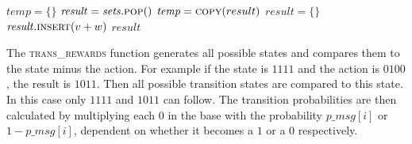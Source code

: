 \documentclass{article}
\begin{document}
		\begin{algorithm}[h!]
			\begin{algorithmic}[1]
				\State $\mathit{temp} = \{\}$
				\State $\mathit{result} = \mathit{sets}.\Call{pop}{}()$
				\State $\mathit{temp} = \Call{copy}{result}$
				\State $\mathit{result} = \{\}$
				\State $\mathit{result}.\Call{insert}{v+w}$
				\EndFor
				\EndFor
				\EndFor
				\State \Return $\mathit{result}$
				\EndFunction
			\end{algorithmic}
			\label{alg:add_sets}
		\end{algorithm}

		\begin{multicols}{2}
		The \textsc{trans\_rewards} function generates all possible states and
		compares them to the state minus the action. For example if the state is
		$1111$ and the action is $0100$, the result is $1011$. Then all possible
		transition states are compared to this state. In this case only $1111$
		and $1011$ can follow. The transition probabilities are then calculated
		by multiplying each $0$ in the base with the probability
		$\mathit{p\_msg[i]}$ or $1 -\mathit{p\_msg[i]}$, dependent on whether it
		becomes a $1$ or a $0$ respectively.
		\end{multicols}
\end{document}
